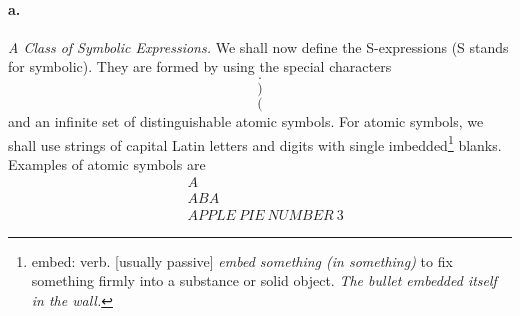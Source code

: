 \documentclass[11pt, a4paper]{article}
\begin{document}
\paragraph{a.}\textit{A Class of Symbolic Expressions.}
We shall now define the S-expressions (S stands for symbolic). They are formed
by using the special characters
$$ \cdot $$
$$ ) $$
$$ ( $$
and an infinite set of distinguishable atomic symbols. For atomic symbols, we
shall use strings of capital Latin letters and digits with single
imbedded\footnote{embed: verb. [usually passive] \textit{embed something (in
    something)} to fix something firmly into a substance or solid
  object. \textit{The bullet embedded itself in the wall.}}
blanks. Examples of atomic symbols are
\begin{align*}
&A   \\
&ABA \\
&APPLE \ PIE \ NUMBER \ 3
\end{align*}
\end{document}
